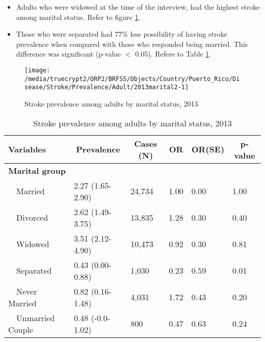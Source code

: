  \newpage
\begin{itemize}

\item Adults who were 
widowed at the time of the interview, had the highest stroke among marital status. Refer to figure \ref{fig:marital.Stroke.2013}.

\item Those who were separated had 77\% less possibility of having stroke prevalence when compared with those who responded being married. This difference was significant (p-value $<$ 0.05). Refere to Table \ref{tab:marital.Stroke.2013}.

\end{itemize}

\begin{figure}[H]
\caption{Stroke prevalence among adults by marital status,
         2013}
\label{fig:marital.Stroke.2013}
\begin{knitrout}
\color{fgcolor}

{\centering \texttt{[image: /media/truecrypt2/ORP2/BRFSS/Objects/Country/Puerto\_Rico/Disease/Stroke/Prevalence/Adult/2013marital2-1]} 

}



\end{knitrout}
 \end{figure}

\begin{table}[H]
\caption{Stroke prevalence  among adults by marital status, 2013\label{tab:marital.Stroke.2013}} 
\begin{center}
\begin{tabular}{llllll}
\hline\hline
\multicolumn{1}{l}{Variables}&\multicolumn{1}{c}{Prevalence}&\multicolumn{1}{c}{Cases (N)}&\multicolumn{1}{c}{OR}&\multicolumn{1}{c}{OR(SE)}&\multicolumn{1}{c}{p-value}\tabularnewline
\hline
{\bfseries Marital group}&&&&&\tabularnewline
~~Married&2.27 (1.65-2.90)&24,734&1.00&0.00&1.00\tabularnewline
~~Divorced&2.62 (1.49-3.75)&13,835&1.28&0.30&0.40\tabularnewline
~~Widowed&3.51 (2.12-4.90)&10,473&0.92&0.30&0.81\tabularnewline
~~Separated&0.43 (0.00-0.88)& 1,030&0.23&0.59&0.01\tabularnewline
~~Never Married&0.82 (0.16-1.48)& 4,031&1.72&0.43&0.20\tabularnewline
~~Unmarried Couple&0.48 (-0.0-1.02)&   800&0.47&0.63&0.24\tabularnewline
\hline
\end{tabular}\end{center}

\end{table}

